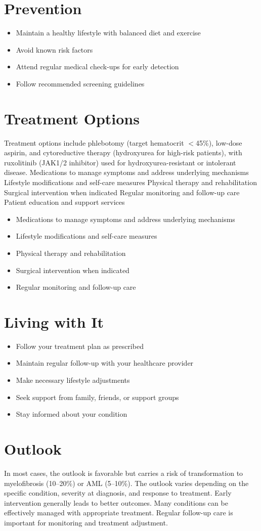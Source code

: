 \section{Prevention}
\begin{itemize}[noitemsep]
  \item Maintain a healthy lifestyle with balanced diet and exercise
  \item Avoid known risk factors
  \item Attend regular medical check-ups for early detection
  \item Follow recommended screening guidelines
\end{itemize}
\section{Treatment Options}
Treatment options include phlebotomy (target hematocrit $<$45\%), low-dose aspirin, and cytoreductive therapy (hydroxyurea for high-risk patients), with ruxolitinib (JAK1/2 inhibitor) used for hydroxyurea-resistant or intolerant disease. Medications to manage symptoms and address underlying mechanisms Lifestyle modifications and self-care measures Physical therapy and rehabilitation Surgical intervention when indicated Regular monitoring and follow-up care Patient education and support services

\begin{itemize}[noitemsep]
  \item Medications to manage symptoms and address underlying mechanisms
  \item Lifestyle modifications and self-care measures
  \item Physical therapy and rehabilitation
  \item Surgical intervention when indicated
  \item Regular monitoring and follow-up care
\end{itemize}
\section{Living with It}
\begin{itemize}[noitemsep]
  \item Follow your treatment plan as prescribed
  \item Maintain regular follow-up with your healthcare provider
  \item Make necessary lifestyle adjustments
  \item Seek support from family, friends, or support groups
  \item Stay informed about your condition
\end{itemize}
\section{Outlook}
In most cases, the outlook is favorable but carries a risk of transformation to myelofibrosis (10--20\%) or AML (5--10\%). The outlook varies depending on the specific condition, severity at diagnosis, and response to treatment. Early intervention generally leads to better outcomes. Many conditions can be effectively managed with appropriate treatment. Regular follow-up care is important for monitoring and treatment adjustment.
